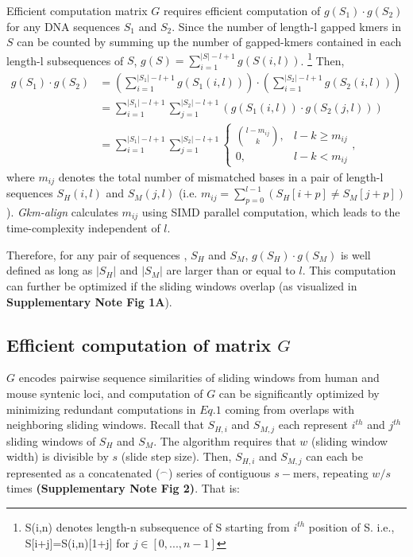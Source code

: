 \documentclass[english]{article}
\begin{document}
Efficient computation matrix $G$ requires efficient computation of $g(S_1) \cdot g(S_2)$ for any DNA sequences $S_1$ and $S_2$. Since the number of length-l gapped kmers in $S$ can be counted by summing up the number of gapped-kmers contained in each length-l subsequences of $S$,  $g(S)=\sum_{i=1}^{|S|-l+1}g(S(i,l))$.  \footnote{S(i,n) denotes length-n subsequence of S starting from $i^{th}$ position of S. i.e., S[i+j]=S(i,n)[1+j] for $j\in [0, ..., n-1]$} Then,
\begin{align*}
g(S_1) \cdot g(S_2) &= (\sum_{i=1}^{|S_1|-l+1}g(S_1(i,l))) \cdot (\sum_{i=1}^{|S_2|-l+1}g(S_2(i,l))) \\
&= \sum_{i=1}^{|S_1|-l+1} \sum_{j=1}^{|S_2|-l+1} (g(S_1(i,l)) \cdot g(S_2(j,l))) \\
&= \sum_{i=1}^{|S_1|-l+1} \sum_{j=1}^{|S_2|-l+1} \begin{cases}
                \binom{l-m_{ij}}{k}, & l-k \geq  m_{ij}\\
                 0 , & l-k < m_{ij}
                    \end{cases}, \tag{Eq.2}
\end{align*}
where $m_{ij}$ denotes the total number of mismatched bases in a pair of length-l sequences $S_H(i,l)$ and $S_M(j,l)$ (i.e. $m_{ij}=\sum_{p=0}^{l-1}(S_H[i+p] \neq S_M[j+p])$). \textit{Gkm-align} calculates $m_{ij}$  using SIMD parallel computation, which leads to the time-complexity independent of $l$.  \newline

Therefore, for any pair of sequences , $S_H$ and $S_M$, $g(S_H) \cdot g(S_M)$ is well defined as long as $|S_H|$ and $|S_M|$ are larger than or equal to $l$. This computation can further be optimized if the sliding windows overlap (as visualized in \textbf{Supplementary Note Fig 1A}).  \newline

\subsection{Efficient computation of matrix $G$}
$G$ encodes pairwise sequence similarities of sliding windows from human and mouse syntenic loci, and computation of $G$ can be significantly optimized by minimizing redundant computations in $Eq.1$ coming from overlaps with neighboring sliding windows. Recall that $S_{H,i}$ and $S_{M,j}$ each represent $i^{th}$ and $j^{th}$ sliding windows of $S_H$ and $S_M$. The algorithm requires that $w$ (sliding window width) is  divisible by $s$ (slide step size). Then, $S_{H,i}$ and $S_{M,j}$ can each be represented as a  concatenated ($^\frown$) series of contiguous $s-$mers, repeating $w/s$ times \textbf{(Supplementary Note Fig 2)}. 
That is:
\end{document}
